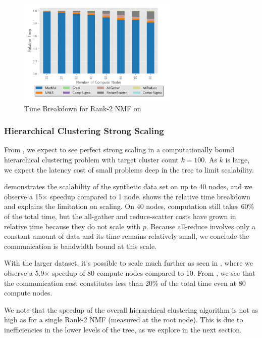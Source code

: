 \begin{figure}
\begin{center}
\includegraphics[height=2in, width=\columnwidth]{plots/realworld_rank2_strongscaling.pdf}
\caption{Time Breakdown for Rank-2 NMF on \image{}}
\label{fig:rwrank2strongscaling}
\end{center}
\end{figure}


\subsubsection{Hierarchical Clustering Strong Scaling}
\label{sec:hiernmf2scaling}

From , we expect to see perfect strong scaling in a computationally bound hierarchical clustering problem with target cluster count $k=100$.
As $k$ is large, we expect the latency cost of small problems deep in the tree to limit scalability.

 demonstrates the scalability of the synthetic data set on up to 40 nodes, and we observe a 15$\times$ speedup compared to 1 node.
 shows the relative time breakdown and explains the limitation on scaling.
On 40 nodes, computation still takes 60\% of the total time, but the all-gather and reduce-scatter costs have grown in relative time because they do not scale with $p$.
Because all-reduce involves only a constant amount of data and its time remains relatively small, we conclude the communication is bandwidth bound at this scale.

With the larger \image{} dataset, it's possible to scale much further as seen in , where we observe a 5.9$\times$ speedup of 80 compute nodes compared to 10.
From , we see that the communication cost constitutes less than 20\% of the total time even at 80 compute nodes. 

We note that the speedup of the overall hierarchical clustering algorithm is not as high as for a single Rank-2 NMF (measured at the root node).
This is due to inefficiencies in the lower levels of the tree, as we explore in the next section.

